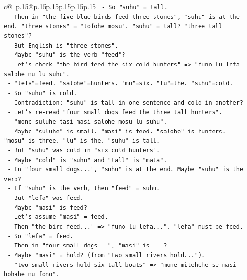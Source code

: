 \documentclass{article}
\begin{document}
{\begin{supertabular}{c@{$\;$}|p{.15\linewidth}@{}p{.15\linewidth}p{.15\linewidth}p{.15\linewidth}p{.15\linewidth}p{.15\linewidth}}
{{{\texttt{        {-} So "suhu" = tall.} \\
\texttt{        {-} Then in "the five blue birds feed three stones", "suhu" is at the end. "three stones" = "tofohe mosu". "suhu" = tall? "three tall stones"?} \\
\texttt{        {-} But English is "three stones".} \\
\texttt{        {-} Maybe "suhu" is the verb "feed"?} \\
\texttt{        {-} Let's check "the bird feed the six cold hunters" => "funo lu lefa salohe mu lu suhu".} \\
\texttt{        {-} "lefa"=feed. "salohe"=hunters. "mu"=six. "lu"=the. "suhu"=cold.} \\
\texttt{        {-} So "suhu" is cold.} \\
\texttt{        {-} Contradiction: "suhu" is tall in one sentence and cold in another?} \\
\texttt{        {-} Let's re{-}read "four small dogs feed the three tall hunters".} \\
\texttt{        {-} "mone suluhe tasi masi salohe mosu lu suhu".} \\
\texttt{        {-} Maybe "suluhe" is small. "masi" is feed. "salohe" is hunters. "mosu" is three. "lu" is the. "suhu" is tall.} \\
\texttt{        {-} But "suhu" was cold in "six cold hunters".} \\
\texttt{        {-} Maybe "cold" is "suhu" and "tall" is "mata".} \\
\texttt{        {-} In "four small dogs...", "suhu" is at the end. Maybe "suhu" is the verb?} \\
\texttt{        {-} If "suhu" is the verb, then "feed" = suhu.} \\
\texttt{        {-} But "lefa" was feed.} \\
\texttt{        {-} Maybe "masi" is feed?} \\
\texttt{        {-} Let's assume "masi" = feed.} \\
\texttt{        {-} Then "the bird feed..." => "funo lu lefa...". "lefa" must be feed.} \\
\texttt{        {-} So "lefa" = feed.} \\
\texttt{        {-} Then in "four small dogs...", "masi" is... ?} \\
\texttt{        {-} Maybe "masi" = hold? (from "two small rivers hold...").} \\
\texttt{        {-} "two small rivers hold six tall boats" => "mone mitehehe se masi hohahe mu fono".} \\
}}}
\end{supertabular}}
\end{document}
